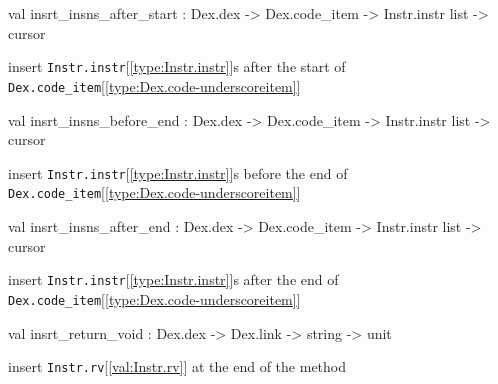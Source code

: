\documentclass[11pt]{article}
\begin{document}
\label{val:Modify.insrt-underscoreinsns-underscoreafter-underscorestart}\begin{ocamldoccode}
val insrt_insns_after_start :
  Dex.dex -> Dex.code_item -> Instr.instr list -> cursor
\end{ocamldoccode}
\begin{ocamldocdescription}
insert {\tt{Instr.instr}}[\ref{type:Instr.instr}]s after the start of {\tt{Dex.code\_item}}[\ref{type:Dex.code-underscoreitem}]


\end{ocamldocdescription}




\label{val:Modify.insrt-underscoreinsns-underscorebefore-underscoreend}\begin{ocamldoccode}
val insrt_insns_before_end :
  Dex.dex -> Dex.code_item -> Instr.instr list -> cursor
\end{ocamldoccode}
\begin{ocamldocdescription}
insert {\tt{Instr.instr}}[\ref{type:Instr.instr}]s before the end of {\tt{Dex.code\_item}}[\ref{type:Dex.code-underscoreitem}]


\end{ocamldocdescription}




\label{val:Modify.insrt-underscoreinsns-underscoreafter-underscoreend}\begin{ocamldoccode}
val insrt_insns_after_end :
  Dex.dex -> Dex.code_item -> Instr.instr list -> cursor
\end{ocamldoccode}
\begin{ocamldocdescription}
insert {\tt{Instr.instr}}[\ref{type:Instr.instr}]s after the end of {\tt{Dex.code\_item}}[\ref{type:Dex.code-underscoreitem}]


\end{ocamldocdescription}




\label{val:Modify.insrt-underscorereturn-underscorevoid}\begin{ocamldoccode}
val insrt_return_void : Dex.dex -> Dex.link -> string -> unit
\end{ocamldoccode}
\begin{ocamldocdescription}
insert {\tt{Instr.rv}}[\ref{val:Instr.rv}] at the end of the method


\end{ocamldocdescription}
\end{document}

